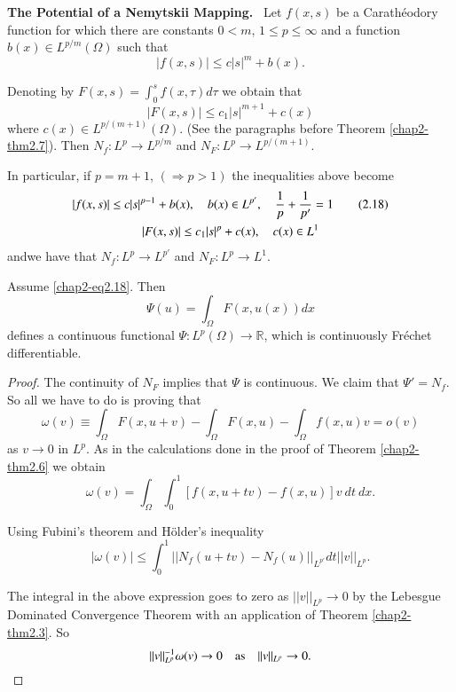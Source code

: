 \noindent
{\bf The Potential of a Nemytskii Mapping.}~ Let $f(x,s)$ be a
Carath\'eodory function for which there are constants $0<m$, $1\leq
p\leq \infty$ and a function $b(x)\in L^{p/m}(\Omega)$ such that
$$
|f(x,s)|\leq c|s|^{m}+b(x).
$$

Denoting by $F(x,s)=\int^{s}_{0}f(x,\tau)d\tau$ we obtain that
$$
|F(x,s)|\leq c_{1}|s|^{m+1}+c(x)
$$
where $c(x)\in L^{p/(m+1)}(\Omega)$. (See the paragraphs before
Theorem \ref{chap2-thm2.7}). Then $N_{f}:L^{p}\to L^{p/m}$ and
$N_{F}:L^{p}\to L^{p/(m+1)}$.

In particular, if $p=m+1$, $(\Rightarrow p>1)$ the inequalities above
become 
\begin{gather*}
|f(x,s)|\leq c|s|^{p-1}+b(x),\quad b(x)\in
L^{p'},\quad\frac{1}{p}+\frac{1}{p'}=1\tag{2.18}\label{chap2-eq2.18}\\
|F(x,s)|\leq c_{1}|s|^{p}+c(x),\quad c(x)\in L^{1} 
\end{gather*}
and\pageoriginale we have that $N_{f}:L^{p}\to L^{p'}$ and
$N_{F}:L^{p}\to L^{1}$.

\begin{theorem}\label{chap2-thm2.8}
Assume \eqref{chap2-eq2.18}. Then
$$
\Psi(u)=\int_{\Omega}F(x,u(x))dx
$$
defines a continuous functional $\Psi:L^{p}(\Omega)\to \mathbb{R}$,
which is continuously Fr\'echet differentiable.
\end{theorem}

\begin{proof}
The continuity of $N_{F}$ implies that $\Psi$ is continuous. We claim
that $\Psi'=N_{f}$. So all we have to do is proving that
$$
\omega(v)\equiv
\int_{\Omega}F(x,u+v)-\int_{\Omega}F(x,u)-\int_{\Omega}f(x,u)v=o(v) 
$$
as $v\to 0$ in $L^{p}$. As in the calculations done in the proof of
Theorem \ref{chap2-thm2.6} we obtain
$$
\omega(v)=\int_{\Omega}\int^{1}_{0}[f(x,u+tv)-f(x,u)]v\ dt\ dx.
$$

Using Fubini's theorem and H\"older's inequality
$$
|\omega(v)|\leq
\int^{1}_{0}||N_{f}(u+tv)-N_{f}(u)||_{L^{p'}}dt||v||_{L^{p}}. 
$$

The integral in the above expression goes to zero as $||v||_{L^{p}}\to
0$ by the Lebesgue Dominated Convergence Theorem with an application
of Theorem \ref{chap2-thm2.3}. So
$$
||v||^{-1}_{L^{p}}\omega(v)\to 0\quad\text{as}\quad ||v||_{L^{p}}\to 0.
$$
\end{proof}


